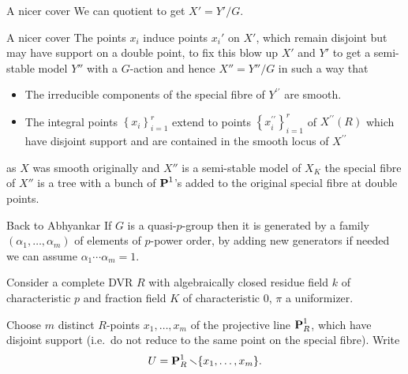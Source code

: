\begin{frame}{A nicer cover}
        We can quotient to get $X' = Y'/G$.
    \end{frame}\begin{frame}{A nicer cover}
        The points $x_i$ induce points $x_i'$ on $X'$, which remain disjoint but may have support on a double point, to fix this blow up $X'$ and $Y'$ to get a semi-stable model $Y''$  with  a $G$-action and hence $X''=Y''/G$ in such a way that
        \begin{itemize}
            \item The irreducible components of the special fibre of $Y^{\prime \prime}$ are smooth.
            \item The integral points $\left\{x_{i}\right\}_{i=1}^{r}$ extend to points $\left\{x_{i}^{\prime \prime}\right\}_{i=1}^{r}$ of $X^{\prime \prime}(R)$ which have disjoint support and are contained in the smooth locus of $X^{\prime \prime}$
        \end{itemize}

        as $X$ was smooth originally and $X''$ is a semi-stable model of $X_K$ the special fibre of $X''$ is a tree with a bunch of $\operatorname{\mathbf {P}}^1$'s added to the original special fibre at double points.

\end{frame}






\begin{frame}{Back to Abhyankar}
    If $G$ is a quasi-$p$-group then it is generated by a family $(\alpha _1, \ldots, \alpha _m)$ of elements of $p$-power order, by adding new generators if needed we can assume $\alpha _1 \cdots \alpha _m = 1$.


    Consider a complete DVR $R$ with algebraically closed residue field $k$ of characteristic $p$ and fraction field $K$ of characteristic $0$, $\pi $ a uniformizer.

    Choose $m$ distinct $R$-points $x_1, \ldots, x_m$ of the projective line $\operatorname{\mathbf {P}}^1_R$, which have disjoint support (i.e.\ do not reduce to the same point on the special fibre).
    Write $$U = \operatorname{\mathbf {P}}^1_R\smallsetminus \{x_1, \ldots, x_m\}.$$

\end{frame}

